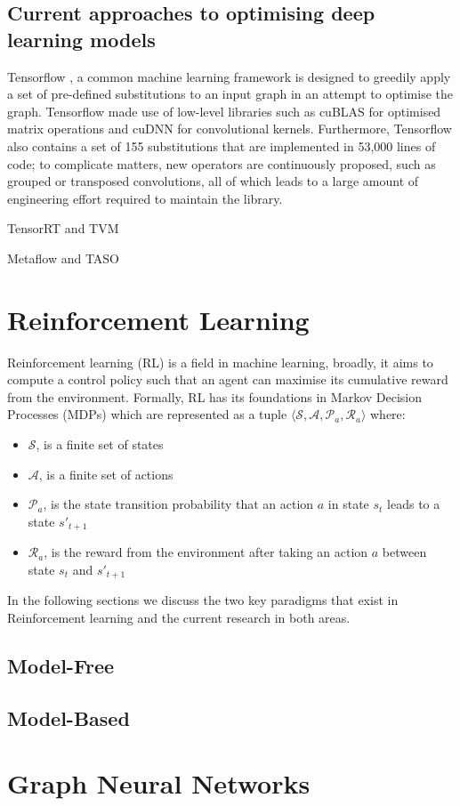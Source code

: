 \subsection{Current approaches to optimising deep learning models}

Tensorflow \cite{tensorflow2015-whitepaper}, a common machine learning framework is designed to greedily apply a set of pre-defined substitutions to an input graph in an attempt to optimise the graph. Tensorflow made use of low-level libraries such as cuBLAS \cite{cublas2008} for optimised matrix operations and cuDNN \cite{chetlur2014cudnn} for convolutional kernels. Furthermore, Tensorflow also contains a set of 155 substitutions that are implemented in 53,000 lines of code; to complicate matters, new operators are continuously proposed, such as grouped or transposed convolutions, all of which leads to a large amount of engineering effort required to maintain the library.

TensorRT and TVM

Metaflow and TASO

\section{Reinforcement Learning}
Reinforcement learning (RL) is a field in machine learning, broadly, it aims to compute a control policy such that an agent can maximise its cumulative reward from the environment. Formally, RL has its foundations in Markov Decision Processes (MDPs) which are represented as a tuple $\langle \mathcal{S}, \mathcal{A}, \mathcal{P}_a, \mathcal{R}_a \rangle$ where:

\begin{itemize}
  \item $\mathcal{S}$, is a finite set of states
  \item $\mathcal{A}$, is a finite set of actions
  \item $\mathcal{P}_a$, is the state transition probability that an action $a$ in state $s_t$ leads to a state $s'_{t+1}$
  \item $\mathcal{R}_a$, is the reward from the environment after taking an action $a$ between state $s_t$ and $s'_{t+1}$
\end{itemize}



In the following sections we discuss the two key paradigms that exist in Reinforcement learning and the current research in both areas. 

\subsection{Model-Free}
\subsection{Model-Based}

\section{Graph Neural Networks}